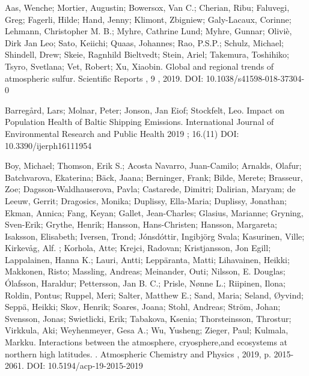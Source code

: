 \enlargethispage{\baselineskip}
\begin{list}{}{\setlength{\leftmargin}{15pt}\setlength{\itemindent}{-\leftmargin}}\small
\item[]
Aas, Wenche; Mortier, Augustin; Bowersox, Van C.; Cherian, Ribu; Faluvegi, Greg; Fagerli, Hilde; Hand, Jenny; Klimont, Zbigniew; Galy-Lacaux, Corinne; Lehmann, Christopher M. B.; Myhre, Cathrine Lund; Myhre, Gunnar; Oliviè, Dirk Jan Leo; Sato, Keiichi; Quaas, Johannes; Rao, P.S.P.; Schulz, Michael; Shindell, Drew; Skeie, Ragnhild Bieltvedt; Stein, Ariel; Takemura, Toshihiko; Tsyro, Svetlana; Vet, Robert; Xu, Xiaobin.
Global and regional trends of atmospheric sulfur.
Scientific Reports , 9 , 2019.
DOI: 10.1038/s41598-018-37304-0

\item[]
Barregård, Lars; Molnar, Peter; Jonson, Jan Eiof; Stockfelt, Leo.
Impact on Population Health of Baltic Shipping Emissions.
International Journal of Environmental Research and Public Health 2019 ; 16.(11)
DOI: 10.3390/ijerph16111954

\item[]
Boy, Michael; Thomson, Erik S.; Acosta Navarro, Juan-Camilo; Arnalds, Olafur; Batchvarova, Ekaterina; Bäck, Jaana; Berninger, Frank; Bilde, Merete; Brasseur, Zoe; Dagsson-Waldhauserova, Pavla; Castarede, Dimitri; Dalirian, Maryam; de Leeuw, Gerrit; Dragosics, Monika; Duplissy, Ella-Maria; Duplissy, Jonathan; Ekman, Annica; Fang, Keyan; Gallet, Jean-Charles; Glasius, Marianne; Gryning, Sven-Erik; Grythe, Henrik; Hansson, Hans-Christen; Hansson, Margareta; Isaksson, Elisabeth; Iversen, Trond; Jónsdóttir, Ingibjörg Svala; Kasurinen, Ville; Kirkevåg, Alf. ; Korhola, Atte; Krejci, Radovan; Kristjansson, Jon Egill; Lappalainen, Hanna K.; Lauri, Antti; Leppäranta, Matti; Lihavainen, Heikki; Makkonen, Risto; Massling, Andreas; Meinander, Outi; Nilsson, E. Douglas; Ólafsson, Haraldur; Pettersson, Jan B. C.; Prisle, Nønne L.; Riipinen, Ilona; Roldin, Pontus; Ruppel, Meri; Salter, Matthew E.; Sand, Maria; Seland, Øyvind; Seppä, Heikki; Skov, Henrik; Soares, Joana; Stohl, Andreas; Ström, Johan; Svensson, Jonas; Swietlicki, Erik; Tabakova, Ksenia; Thorsteinsson, Throstur; Virkkula, Aki; Weyhenmeyer, Gesa A.; Wu, Yusheng; Zieger, Paul; Kulmala, Markku.
Interactions between the atmosphere, cryosphere,and ecosystems at northern high latitudes. .
Atmospheric Chemistry and Physics , 2019, p. 2015-2061.
DOI: 10.5194/acp-19-2015-2019


\end{list}

